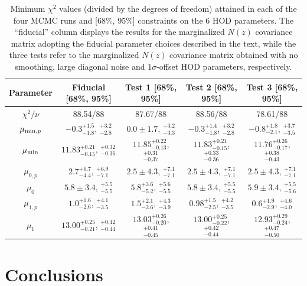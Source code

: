\documentclass[a4paper,11pt]{article}
\begin{document}
\begin{table}
\begin{center}
\begin{tabular}{c | c c c c} 
 \hline\hline
 Parameter & Fiducial [68\%, 95\%] & Test 1 [68\%, 95\%] & Test 2 [68\%, 95\%] & Test 3 [68\%, 95\%] \\ [0.5ex] 
 \hline
 $\chi^2/\nu$ & 88.54/88 & 87.67/88 & 88.56/88 & 78.61/88 \\ 
$\mu_{{\rm min},p}$ & $-0.3^{+1.5}_{-1.8}$, $^{+3.2}_{-2.8}$ & $0.0\pm 1.7$, $^{+3.2}_{-3.3}$ & $-0.3^{+1.4}_{-1.8}$, $^{+3.2}_{-2.8}$ & $-0.8^{+1.8}_{-2.1}$, $^{+3.7}_{-3.5}$ \\ [1ex]
$\mu_{\rm min}$ & $11.83^{+0.21}_{-0.15}$, $^{+0.32}_{-0.36}$ & $11.85^{+0.22}_{-0.13}$, $^{+0.31}_{-0.37}$ & $11.83^{+0.21}_{-0.15}$, $^{+0.33}_{-0.36}$ & $11.76^{+0.26}_{-0.17}$, $^{+0.38}_{-0.43}$ \\ [1ex]
$\mu_{0,p}$ & $2.7^{+6.7}_{-4.4}$, $^{+6.9}_{-7.1}$ & $2.5\pm 4.3$, $^{+7.1}_{-7.1}$ & $2.5\pm 4.3$, $^{+7.1}_{-7.1}$ & $2.5\pm 4.3$, $^{+7.1}_{-7.1}$ \\ [1ex]
$\mu_{0}$ & $5.8\pm 3.4$, $^{+5.5}_{-5.5}$ & $5.8^{+3.6}_{-5.2}$, $^{+5.6}_{-5.5}$ & $5.8\pm 3.4$, $^{+5.5}_{-5.5}$ & $5.9\pm 3.4$, $^{+5.5}_{-5.6}$ \\ [1ex]
$\mu_{1,p}$ & $1.0^{+1.6}_{-2.6}$, $^{+4.1}_{-3.5}$ & $1.5^{+2.1}_{-2.6}$, $^{+4.3}_{-3.9}$ & $0.98^{+1.5}_{-2.5}$, $^{+4.2}_{-3.5}$ & $0.6^{+1.9}_{-2.9}$, $^{+4.6}_{-4.0}$ \\ [1ex]
$\mu_{1}$ & $13.00^{+0.25}_{-0.21}$, $^{+0.42}_{-0.44}$ & $13.03^{+0.26}_{-0.20}$, $^{+0.41}_{-0.45}$ & $13.00^{+0.25}_{-0.22}$, $^{+0.42}_{-0.44}$ & $12.93^{+0.29}_{-0.24}$, $^{+0.47}_{-0.50}$ \\ [1ex]
 \hline
 \hline
\end{tabular}
\end{center}
\caption{Minimum $\chi^2$ values (divided by the degrees
of freedom) attained in each of the four MCMC runs
and [68\%, 95\%] constraints on the 6 HOD parameters. The
``fiducial'' column displays the results for the marginalized
$N(z)$ covariance matrix adopting the fiducial parameter
choices described in the text, while the three tests
refer to the marginalized $N(z)$ covariance matrix
obtained with no smoothing, large diagonal noise and
$1\sigma$-offset HOD parameters, respectively.}
\label{tab:chi2_tests}
\end{table}



\section{Conclusions}
\label{sec:conclusions}
\end{document}
